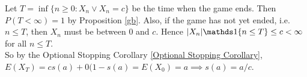 \documentclass[11pt]{article}
\begin{document}
    \example[Gambler's Ruin problem - $p = 1/2$]
    Let $T = \inf\{ n \geq 0:X_n \lor X_n = c\}$ be the time when the game ends. Then $P(T<\infty) = 1$ by Proposition \ref{gb}. Also, if the game has not yet ended, i.e. $n \leq T$, then $X_n$ must be between $0$ and $c$. Hence $|X_n|\id{n \leq T}\leq c < \infty$ for all $n \leq T$.\\
    So by the Optional Stopping Corollary \ref{Optional Stopping Corollary}, $E(X_T) = cs(a) + 0(1-s(a) = E(X_0) = a \implies s(a) = a/c$.
    
    
    
    
    
    
    
    
    
    
    
    
    
    
    
\end{document}
